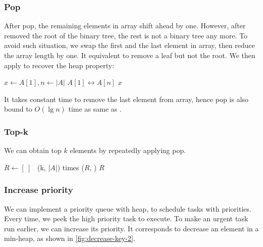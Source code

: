 \documentclass[b5paper]{article}
\begin{document}
\subsubsection{Pop}

After pop, the remaining elements in array shift ahead by one. However, after removed the root of the binary tree, the rest is not a binary tree any more. To avoid such situation, we swap the first and the last element in array, then reduce the array length by one. It equivalent to remove a leaf but not the root. We then apply  to recover the heap property:

\begin{algorithmic}[1]
  \State $x \gets A [1], n \gets |A|$
  \State {} $A[1] \leftrightarrow A[n]$
  \State {}
    \State {}
  \EndIf
  \State \Return $x$
\EndFunction
\end{algorithmic}

It takes constant time to remove the last element from array, hence pop is also bound to $O(\lg n)$ time as same as .

\subsubsection{Top-k}

We can obtain top $k$ elements by repeatedly applying pop.

\begin{algorithmic}[1]
  \State $R \gets [\ ]$
  \State {}
  \Loop \ (k, |$A$|) times 
    \State {}($R$, )
  \EndLoop
  \State \Return $R$
\EndFunction
\end{algorithmic}

\subsubsection{Increase priority}

We can implement a priority queue with heap, to schedule tasks with priorities. Every time, we peek the high priority task to execute. To make an urgent task run earlier, we can increase its priority. It corresponds to decrease an element in a min-heap, as shown in \ref{fig:decrease-key-2}.
\end{document}
